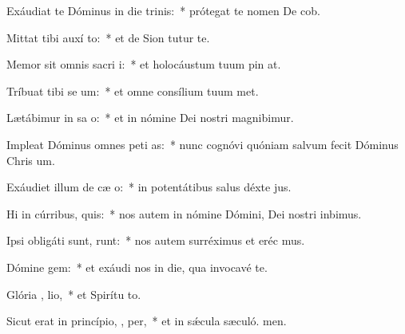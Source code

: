 \item Exáudiat te Dóminus in die trinis:~* prótegat te nomen De cob.
\item Mittat tibi auxí  to:~* et de Sion tutur te.
\item Memor sit omnis sacri i:~* et holocáustum tuum pin at.
\item Tríbuat tibi se  um:~* et omne consílium tuum met.
\item Lætábimur in sa o:~* et in nómine Dei nostri magnibimur.
\item Impleat Dóminus omnes peti as:~* nunc cognóvi quóniam salvum fecit Dóminus Chris um.
\item Exáudiet illum de cæ  o:~* in potentátibus salus déxte jus.
\item Hi in cúrribus,    quis:~* nos autem in nómine Dómini, Dei nostri inbimus.
\item Ipsi obligáti sunt,  runt:~* nos autem surréximus et eréc mus.
\item Dómine   gem:~* et exáudi nos in die, qua invocavé te.
\item Glória ,  lio,~* et Spirítu to.
\item Sicut erat in princípio,  ,  per,~* et in sǽcula sæculó. men.
